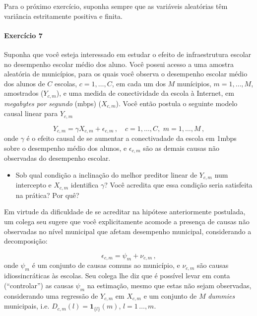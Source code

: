 \documentclass[10pt,a4paper]{article}
\begin{document}
 
 \vspace{1em}
 		Para o próximo exercício, suponha sempre que as variáveis aleatórias têm variância estritamente positiva e finita.
 
  \paragraph{Exercício 7} Suponha que você esteja interessado em estudar o efeito de infraestrutura escolar no desempenho escolar médio dos aluno. Você possui acesso a uma amostra aleatória de municípios, para os quais você observa o desempenho escolar médio dos alunos de $C$ escolas, $c=1,\ldots, C$, em cada um dos $M$ munícipios,  $m=1,\ldots, M$, amostrados ($Y_{c,m}$), e uma medida de conectividade da escola à Internet, em \textit{megabytes por segundo} (mbps) ($X_{c,m}$). Você então postula o seguinte modelo causal linear para $Y_{c,m}$
  
  $$Y_{c,m} = \gamma X_{c,m} + \epsilon_{c,m}\,,\quad c=1, \ldots,  C, \, \, m=1,\ldots, M\, ,$$
 onde $\gamma$ é o efeito causal de se aumentar a conectivadade da escola em 1mbps sobre o desempenho médio dos alunos, e $\epsilon_{c,m}$ são as demais causas não observadas do desempenho escolar.
 
 \begin{itemize}
 	\item[a] Sob qual condição a inclinação do melhor preditor linear de $Y_{c,m}$ num intercepto e $X_{c,m}$ identifica $\gamma$? Você acredita que essa condição seria satisfeita na prática? Por quê?
 \end{itemize}
 \vspace{0.5 em}
 
 Em virtude da dificuldade de se acreditar na hipótese anteriormente postulada, um colega seu sugere que você explicitamente acomode a presença de causas não observadas no nível municipal que afetam desempenho municipal, considerando a decomposição:
 
 $$\epsilon_{c,m} = \psi_m + \nu_{c,m}\, , $$
 onde $\psi_m$ é um conjunto de causas comuns ao município, e $\nu_{c,m}$ são causas idiossincráticas às escolas. Seu colega lhe diz que é possível levar em conta  (``controlar'') as causas $\psi_m$ na estimação, mesmo que estas não sejam observadas, considerando uma regressão de $Y_{c,m}$ em $X_{c,m}$ e um conjunto de $M$ \textit{dummies} municipais, i.e. $D_{c,m}(l) =\mathbf{1}_{\{l\}}(m)$, $l=1\,\ldots, m$.
 
\end{document}
